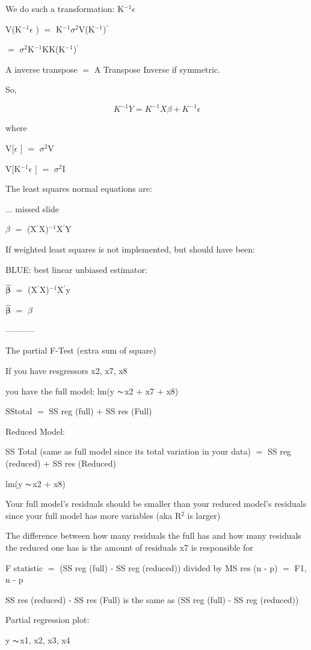 \documentclass[12pt]{extarticle}
\newcommand{\mt}[1]{\ensuremath{#1}}
\newcommand{\ep}{\mt{\epsilon} }         %
\newcommand{\bta}{\mt{\beta} }
\newcommand{\ps}{\mt{\operatorname{+}} }
\newcommand{\ms}{\mt{\operatorname{-}} }
\newcommand{\eql}{ \mt{\operatorname{=}} }
\newcommand{\pr}{\mt{^\prime}} 		   %
\newcommand{\uf}[2]{#1\mt{^{#2}}}
\newcommand{\eqn}[1]{\[#1\]}
\newcommand{\txt}[1]{\text{#1}} %
\newcommand{\tl}{\mt{\thicksim}}
\newcommand{\ssq}{\mt{\sigma^2}}
\newcommand{\bh}[1]{\mathbf{\hat{\text{$#1$}}}}
\newcommand{\bth}{\mt{\bh{\beta}}}
\newcommand{\exv}[1]{\txt{E[}#1\txt{]}}
\newcommand{\vrn}[1]{V[#1]}
\begin{document}
We do such a transformation: \uf{K}{-1}\ep

V(\uf{K}{-1}\ep) \eql \uf{K}{-1}\ssq V(\uf{K}{-1})\pr 

\eql \ssq \uf{K}{-1}KK(\uf{K}{-1})\pr 

A inverse transpose \eql A Transpose Inverse if symmetric. 

So,

\eqn{K^{-1}Y = K^{-1}X\bta + K^{-1}\ep}

where

\vrn{\ep} \eql \ssq V

\vrn{\uf{K}{-1}\ep} \eql \ssq I

The least squares normal equations are:

... missed slide

\bta \eql (X\pr X)$^{-1}$X\pr Y

If weighted least squares is not implemented, but should have been:


BLUE: best linear unbiased estimator:

\bth \eql (X\pr X)$^{-1}$X\pr y

\exv{\bth} \eql \bta 

-----------

The partial F-Test (extra sum of square)

If you have resgressors x2, x7, x8

you have the full model: lm(y \tl x2 \ps x7 \ps x8)

SStotal \eql SS reg (full) \ps SS res (Full)

Reduced Model:

SS Total (same as full model since its total variation in your data) \eql SS reg (reduced) \ps SS res (Reduced) 

lm(y \tl x2 \ps x8)

Your full model's residuals should be smaller than your reduced model's residuals since your full model has more variables (aka \uf{R}{2} is larger)

The difference between how many residuals the full has and how many residuals the reduced one has is the amount of residuals x7 is responsible for

F statistic \eql (SS reg (full) \ms SS reg (reduced)) divided by MS res (n \ms p) \eql F1, n \ms p

SS res (reduced) \ms SS res (Full) is the same as (SS reg (full) \ms SS reg (reduced))

Partial regression plot:

y \tl x1, x2, x3, x4
\end{document}
